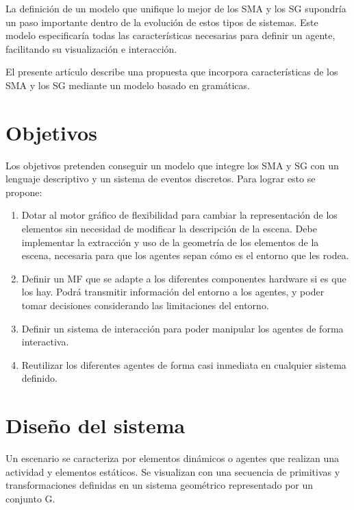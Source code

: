 \documentclass[runningheads]{llncs}
\begin{document}
La definici\'on de un modelo que unifique lo mejor de los SMA y los SG supondr\'ia un paso importante dentro de la evoluci\'on de estos tipos de sistemas. Este modelo especificar\'ia todas las caracter\'isticas necesarias para definir un agente, facilitando su visualizaci\'on e interacci\'on.

El presente art\'iculo describe una propuesta que incorpora caracter\'isticas de los SMA y los SG mediante un modelo basado en gram\'aticas.


\section{Objetivos\label{sec:Objetivos}}

Los objetivos pretenden conseguir un modelo que integre los SMA y SG con un lenguaje descriptivo y un sistema de eventos discretos. Para lograr esto se propone:

\begin{enumerate}

\item Dotar al motor gr\'afico de flexibilidad para cambiar la representaci\'on de los elementos sin necesidad de modificar la descripci\'on de la escena. Debe implementar la extracci\'on y uso de la geometr\'ia de los elementos de la escena, necesaria para que los agentes sepan c\'omo es el entorno que les rodea.

\item Definir un MF que se adapte a los diferentes componentes hardware si es que los hay. Podr\'a transmitir informaci\'on del entorno a los agentes, y poder tomar decisiones considerando las limitaciones del entorno.

\item Definir un sistema de interacci\'on para poder manipular los agentes de forma interactiva.

\item Reutilizar los diferentes agentes de forma casi inmediata en cualquier sistema definido.

\end{enumerate}

\section{Dise\~{n}o del sistema\label{sec:DisenodelSistema}}

Un escenario se caracteriza por elementos din\'amicos o agentes que realizan una actividad y elementos est\'aticos. Se visualizan con una secuencia de primitivas y transformaciones definidas en un sistema geom\'etrico representado por un conjunto G.
\end{document}
